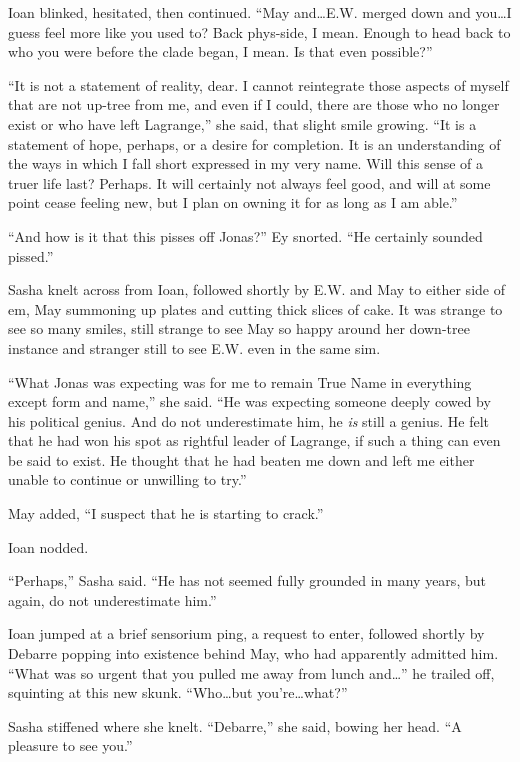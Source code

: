 Ioan blinked, hesitated, then continued. ``May and\ldots E.W. merged down and you\ldots I guess feel more like you used to? Back phys-side, I mean. Enough to head back to who you were before the clade began, I mean. Is that even possible?''

``It is not a statement of reality, dear. I cannot reintegrate those aspects of myself that are not up-tree from me, and even if I could, there are those who no longer exist or who have left Lagrange,'' she said, that slight smile growing. ``It is a statement of hope, perhaps, or a desire for completion. It is an understanding of the ways in which I fall short expressed in my very name. Will this sense of a truer life last? Perhaps. It will certainly not always feel good, and will at some point cease feeling new, but I plan on owning it for as long as I am able.''

``And how is it that this pisses off Jonas?'' Ey snorted. ``He certainly sounded pissed.''

Sasha knelt across from Ioan, followed shortly by E.W. and May to either side of em, May summoning up plates and cutting thick slices of cake. It was strange to see so many smiles, still strange to see May so happy around her down-tree instance and stranger still to see E.W. even in the same sim.

``What Jonas was expecting was for me to remain True Name in everything except form and name,'' she said. ``He was expecting someone deeply cowed by his political genius. And do not underestimate him, he \emph{is} still a genius. He felt that he had won his spot as rightful leader of Lagrange, if such a thing can even be said to exist. He thought that he had beaten me down and left me either unable to continue or unwilling to try.''

May added, ``I suspect that he is starting to crack.''

Ioan nodded.

``Perhaps,'' Sasha said. ``He has not seemed fully grounded in many years, but again, do not underestimate him.''

Ioan jumped at a brief sensorium ping, a request to enter, followed shortly by Debarre popping into existence behind May, who had apparently admitted him. ``What was so urgent that you pulled me away from lunch and\ldots{}'' he trailed off, squinting at this new skunk. ``Who\ldots but you're\ldots what?''

Sasha stiffened where she knelt. ``Debarre,'' she said, bowing her head. ``A pleasure to see you.''


